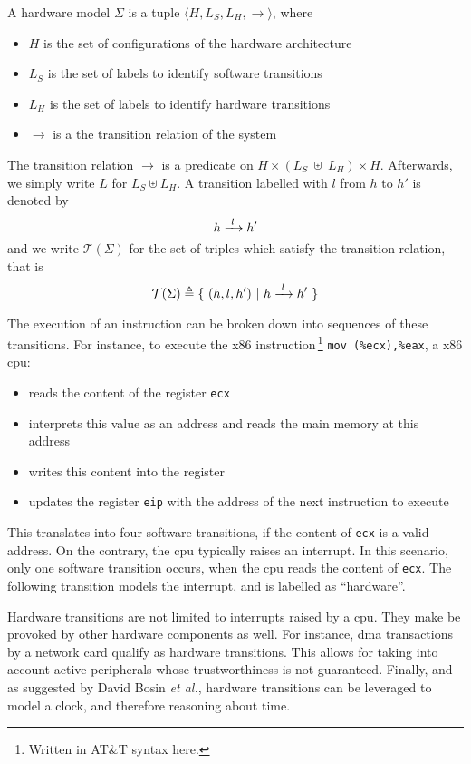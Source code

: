 \begin{definition}
  \label{def:speccert:model}
  A hardware model $\Sigma$ is a tuple
  $\langle H, L_S, L_H, \rightarrow \rangle$, where
  \begin{itemize}
  \item $H$ is the set of configurations of the hardware architecture
  \item $L_S$ is the set of labels to identify software transitions
  \item $L_H$ is the set of labels to identify hardware transitions
  \item $\rightarrow$ is a the transition relation of the system
  \end{itemize}

  The transition relation $\rightarrow$ is a predicate on
  $H \times (L_S~\uplus~L_H) \times H$.
  Afterwards, we simply write $L$ for $L_S \uplus L_H$.
  A transition labelled with $l$ from $h$ to $h'$ is denoted by
  \[
    h \xrightarrow{\hskip0.3em\relax l\hskip0.3em\relax} h'
  \]
  and we write $\mathcal{T}(\Sigma)$ for the set of triples which satisfy the
  transition relation, that is
  \[
    \mathcal{T}(\Sigma) \triangleq \{\ (h, l, h')\ |\
    h \xrightarrow{\hskip0.3em\relax l\hskip0.3em\relax} h'\ \}
  \]
\end{definition}

The execution of an instruction can be broken down into sequences of these
transitions.
%
For instance, to execute the x86 instruction\,\footnote{Written in AT\&T syntax
  here.} \texttt{mov (\%ecx),\%eax}, a x86 \ac{cpu}:
%
\begin{itemize}
\item reads the content of the register \texttt{ecx}
%
\item interprets this value as an address and reads the main memory at this
  address
%
\item writes this content into the register 
%
\item updates the register \texttt{eip} with the address of the next instruction
  to execute
\end{itemize}

This translates into four software transitions, if the content of \texttt{ecx}
is a valid address.
%
On the contrary, the \ac{cpu} typically raises an interrupt.
%
In this scenario, only one software transition occurs, when the \ac{cpu} reads
the content of \texttt{ecx}.
%
The following transition models the interrupt, and is labelled as ``hardware''.

Hardware transitions are not limited to interrupts raised by a \ac{cpu}.
%
They make be provoked by other hardware components as well.
%
For instance, \ac{dma} transactions by a network card qualify as hardware
transitions.
%
This allows for taking into account active peripherals whose trustworthiness is
not guaranteed.
%
Finally, and as suggested by David Bosin \emph{et al.}, hardware transitions can
be leveraged to model a clock, and therefore reasoning about time.

